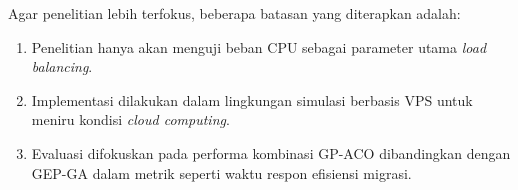 Agar penelitian lebih terfokus, beberapa batasan yang diterapkan adalah:

\begin{enumerate}
  \item Penelitian hanya akan menguji beban CPU sebagai parameter utama \textit{load balancing}. 
  \item Implementasi dilakukan dalam lingkungan simulasi berbasis VPS untuk meniru kondisi \textit{cloud computing}. 
  \item Evaluasi difokuskan pada performa kombinasi GP-ACO dibandingkan dengan GEP-GA dalam metrik seperti waktu respon efisiensi migrasi.
\end{enumerate}
